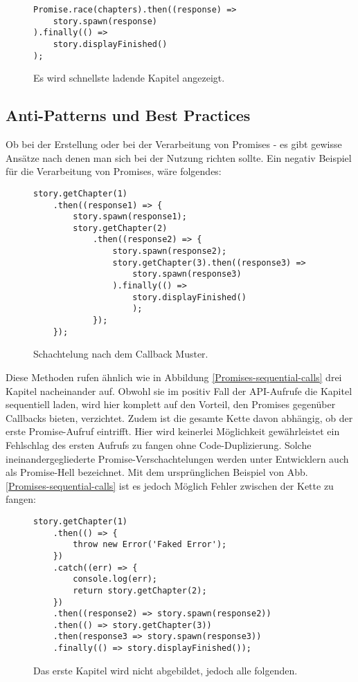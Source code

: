 \begin{figure}[H]
\begin{lstlisting}[basicstyle=\small]
Promise.race(chapters).then((response) =>
    story.spawn(response)
).finally(() =>
    story.displayFinished()
);
\end{lstlisting}
\caption{Es wird schnellste ladende Kapitel angezeigt.}
\end{figure}

\subsection{Anti-Patterns und Best Practices}

Ob bei der Erstellung oder bei der Verarbeitung von Promises - es gibt gewisse Ansätze nach denen man sich bei der Nutzung richten sollte. Ein negativ Beispiel für die Verarbeitung von Promises, wäre folgendes:

\begin{figure}[H]
\begin{lstlisting}[basicstyle=\small]
story.getChapter(1)
    .then((response1) => {
        story.spawn(response1);
        story.getChapter(2)
            .then((response2) => {
                story.spawn(response2);
                story.getChapter(3).then((response3) =>
                    story.spawn(response3)
                ).finally(() => 
                    story.displayFinished()
                    );
            });
    });
\end{lstlisting}
\caption{Schachtelung nach dem Callback Muster.}
\end{figure}

\noindent
Diese Methoden rufen ähnlich wie in Abbildung \ref{Promises-sequential-calls} drei Kapitel nacheinander auf. Obwohl sie im positiv Fall der API-Aufrufe die Kapitel sequentiell laden, wird hier komplett auf den Vorteil, den Promises gegenüber Callbacks bieten, verzichtet. Zudem ist die gesamte Kette davon abhängig, ob der erste Promise-Aufruf eintrifft. Hier wird keinerlei Möglichkeit gewährleistet ein Fehlschlag des ersten Aufrufs zu fangen ohne Code-Duplizierung. Solche ineinandergegliederte Promise-Verschachtelungen werden unter Entwicklern auch als \glqq{}Promise-Hell\grqq{} bezeichnet.
Mit dem ursprünglichen Beispiel von Abb. \ref{Promises-sequential-calls} ist es jedoch Möglich Fehler zwischen der Kette zu fangen:

\begin{figure}[H]
\begin{lstlisting}[basicstyle=\small]
story.getChapter(1)
    .then(() => {
        throw new Error('Faked Error');
    })
    .catch((err) => {
        console.log(err);
        return story.getChapter(2);
    })
    .then((response2) => story.spawn(response2))
    .then(() => story.getChapter(3))
    .then(response3 => story.spawn(response3))
    .finally(() => story.displayFinished());
\end{lstlisting}
\caption{Das erste Kapitel wird nicht abgebildet, jedoch alle folgenden.}
\end{figure}

